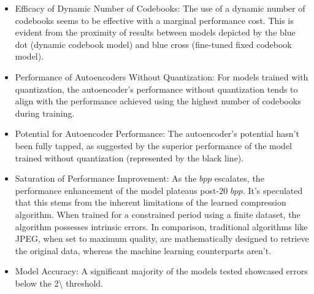 \documentclass[runningheads]{llncs}
\begin{document}
\begin{itemize}
    \item Efficacy of Dynamic Number of Codebooks: The use of a dynamic number of codebooks 
seems to be effective with a marginal performance cost. This is evident from the proximity of 
results between models depicted by the blue dot (dynamic codebook model) and blue cross 
(fine-tuned fixed codebook model). 
\item Performance of Autoencoders Without Quantization: For models trained with quantization, 
the autoencoder's performance without quantization tends to align with the performance 
achieved using the highest number of codebooks during training.
\item Potential for Autoencoder Performance: The autoencoder's potential hasn't been fully 
tapped, as suggested by the superior performance of the model trained without quantization 
(represented by the black line).
\item Saturation of Performance Improvement: As the $bpp$ escalates, the performance 
enhancement of the model plateaus post-20 $bpp$. It's speculated that this stems from the 
inherent limitations of the learned compression algorithm. When trained for a constrained 
period using a finite dataset, the algorithm possesses intrinsic errors. In comparison, 
traditional algorithms like JPEG, when set to maximum quality, are mathematically designed 
to retrieve the original data, whereas the machine learning counterparts aren't.
\item Model Accuracy: A significant majority of the models tested showcased errors below the 2\textbackslash{}%
threshold.
\end{itemize}
\end{document}
